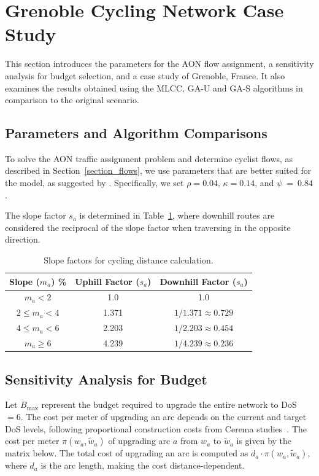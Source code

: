 \documentclass[letterpaper, 10 pt, conference]{ieeeconf}  %
\begin{document}


\section{Grenoble Cycling Network Case Study}
\label{study_case}
This section introduces the parameters for the AON flow assignment, a sensitivity analysis for budget selection, and a case study of Grenoble, France. It also examines the results obtained using the MLCC, \mbox{GA-U} and \mbox{GA-S} algorithms in comparison to the original scenario.
 \subsection{Parameters and Algorithm Comparisons}
To solve the AON traffic assignment problem and determine cyclist flows, as described in Section~\ref{section_flows}, we use parameters that are better suited for the model, as suggested by \cite{cooper2017using}. Specifically, we set $\rho = 0.04$, $\kappa = 0.14$, and $\psi~=~0.84$. 

The slope factor $s_{a}$ is determined in Table~\ref{table:slope_factors}, where downhill routes are considered the reciprocal of the slope factor when traversing in the opposite direction.
\begin{table}[h!]
\centering
\begin{tabular}{c|c|c}
\hline
Slope ($m_a$) \% & Uphill Factor ($s_a$) & Downhill Factor ($s_a$) \\ \hline
$m_a < 2$ & 1.0 & 1.0 \\ 
$2 \leq m_a < 4$ & 1.371 & $1/1.371 \approx 0.729$ \\ 
$4 \leq m_a < 6$ & 2.203 & $1/2.203 \approx 0.454$ \\ 
$m_a \geq 6$ & 4.239 & $1/4.239 \approx 0.236$ \\ \hline
\end{tabular}
\caption{\footnotesize Slope factors for cycling distance calculation.}
\label{table:slope_factors}
\end{table}




\subsection{Sensitivity Analysis for Budget}
\label{budget_analysis}
 Let $B_{\text{max}}$ represent the budget required to upgrade the entire network to DoS $=6$. The cost per meter of upgrading an arc depends on the current and target DoS levels, following proportional construction costs from Cerema studies~\cite{cerema2024_cost}. The cost per meter $\pi(w_a, \tilde{w}_a)$ of upgrading arc $a$ from $w_a$ to $\tilde{w}_a$ is given by the matrix below. The total cost of upgrading an arc is computed as $d_a \cdot \pi(w_a, \tilde{w}_a)$, where $d_a$ is the arc length, making the cost distance-dependent.
\end{document}
